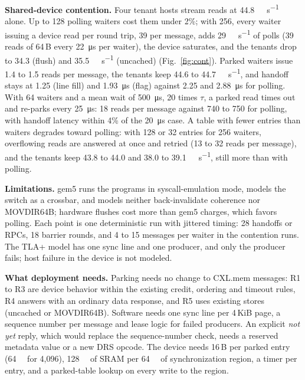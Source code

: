 \documentclass[journal]{IEEEtran}
\begin{document}
\textbf{Shared-device contention.} Four tenant hosts stream reads at \SI{44.8}{\giga\byte\per\second}
alone. Up to 128 polling waiters cost them under 2\%; with 256, every waiter issuing a device read
per round trip, 39 per message, adds \SI{29}{\giga\byte\per\second} of polls (39 reads of
64\,B every \SI{22}{\micro\second} per waiter), the device saturates, and the tenants drop to 34.3
(flush) and \SI{35.5}{\giga\byte\per\second} (uncached) (Fig.~\ref{fig:cont}). Parked waiters issue
1.4 to 1.5 reads per message, the tenants keep 44.6 to \SI{44.7}{\giga\byte\per\second}, and handoff
stays at 1.25 (line fill) and \SI{1.93}{\micro\second} (flag) against 2.25 and
\SI{2.88}{\micro\second} for polling. With 64 waiters and a mean wait of \SI{500}{\micro\second}, 20
times $\tau$, a parked read times out and re-parks every \SI{25}{\micro\second}: 18 reads per
message against 740 to 750 for polling, with handoff latency within 4\% of the
\SI{20}{\micro\second} case. A table with fewer entries than waiters degrades toward polling:
with 128 or 32 entries for 256 waiters, overflowing reads are answered at once and retried (13 to
32 reads per message), and the tenants keep 43.8 to 44.0 and 38.0 to
\SI{39.1}{\giga\byte\per\second}, still more than with polling.

\textbf{Limitations.} gem5 runs the programs in syscall-emulation mode, models the switch as a
crossbar, and models neither back-invalidate coherence nor MOVDIR64B; hardware flushes cost more
than gem5 charges, which favors polling. Each point is one deterministic run with jittered timing:
28 handoffs or RPCs, 18 barrier rounds, and 4 to 15 messages per waiter in the contention runs. The
TLA+ model has one sync line and one producer, and only the producer fails; host failure in the
device is not modeled.

\textbf{What deployment needs.} Parking needs no change to CXL.mem messages: R1 to R3 are device
behavior within the existing credit, ordering and timeout rules, R4 answers with an ordinary data
response, and R5 uses existing stores (uncached or MOVDIR64B). Software needs one sync line per
4\,KiB page, a sequence number per message and lease logic for failed producers. An explicit
\emph{not yet} reply, which would replace the sequence-number check, needs a reserved metadata
value or a new DRS opcode. The device needs 16\,B per parked entry (\SI{64}{\kibi\byte} for 4,096),
\SI{128}{\kibi\byte} of SRAM per \SI{64}{\mebi\byte} of synchronization region, a timer per entry,
and a parked-table lookup on every write to the region.
\end{document}
